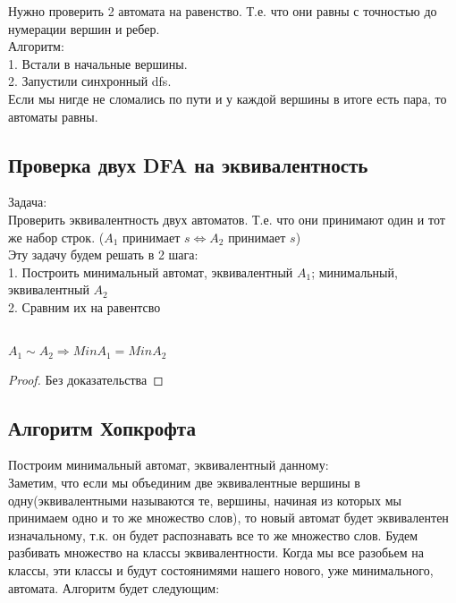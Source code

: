 Нужно проверить 2 автомата на равенство. Т.е. что они равны с точностью до нумерации вершин и ребер.\\

Алгоритм:\\
1. Встали в начальные вершины.\\
2. Запустили синхронный dfs.\\
Если мы нигде не сломались по пути и у каждой вершины в итоге есть пара, то автоматы равны.\\

\subsection{Проверка двух DFA на эквивалентность}
Задача:\\
Проверить эквивалентность двух автоматов. Т.е. что они принимают один и тот же набор строк.
($A_1$ принимает $s \Leftrightarrow A_2$ принимает $s$)\\

Эту задачу будем решать в 2 шага:\\
1. Построить минимальный автомат, эквивалентный $A_1$; минимальный, эквивалентный $A_2$\\
2. Сравним их на равентсво\\
\\

\begin{theorem}{}
$A_1 \sim A_2 \Rightarrow Min A_1 = Min A_2$
\end{theorem}

\begin{proof}
Без доказательства
\end{proof}

\subsection{Алгоритм Хопкрофта}
Построим минимальный автомат, эквивалентный данному:\\
Заметим, что если мы объединим две эквивалентные вершины в одну(эквивалентными называются те, вершины, начиная из которых мы принимаем одно и 
то же множество слов), то новый автомат будет эквивалентен изначальному, т.к. он будет
распознавать все то же множество слов. Будем разбивать множество на классы эквивалентности. Когда мы все разобьем на классы,
эти классы и будут состоянимями нашего нового, уже минимального, автомата. Алгоритм будет следующим:

